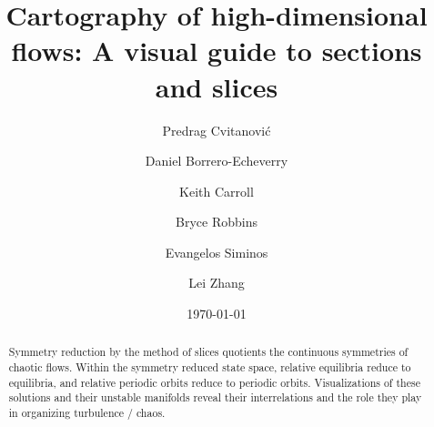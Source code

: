 \documentclass[aip,cha,reprint,
secnumarabic,
nofootinbib, tightenlines,
nobibnotes, showkeys, showpacs,
groupedaddress
]{revtex4-1}
\begin{document}
\title[High-dimensional cartography]
{Cartography of high-dimensional flows: A visual guide to sections and slices}


\author{Predrag Cvitanovi{\'c}}
\author{Daniel Borrero-Echeverry}
\author{Keith Carroll}
\author{Bryce Robbins}
\author{Evangelos Siminos}
\author{Lei Zhang}

\date{\today}

\begin{abstract}
Symmetry reduction by the method of slices quotients the continuous
symmetries of chaotic flows. Within the symmetry reduced state space,
relative equilibria reduce to equilibria, and relative periodic orbits reduce to
periodic orbits. Visualizations of these solutions and their unstable
manifolds reveal their interrelations and the role they play in
organizing turbulence / chaos.

\end{abstract}


\maketitle
\end{document}
